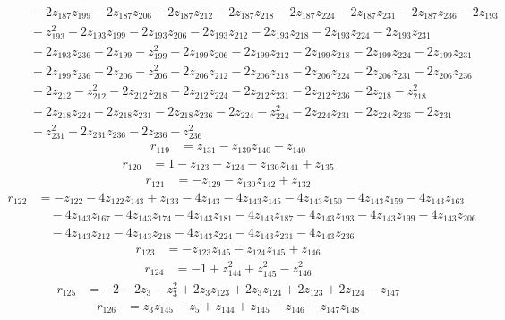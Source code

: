 \begin{align*}
&\quad -2z_{187}z_{199}-2z_{187}z_{206}-2z_{187}z_{212}-2z_{187}z_{218}-2z_{187}z_{224}-2z_{187}z_{231}-2z_{187}z_{236}-2z_{193}\\
&\quad -z_{193}^{2}-2z_{193}z_{199}-2z_{193}z_{206}-2z_{193}z_{212}-2z_{193}z_{218}-2z_{193}z_{224}-2z_{193}z_{231}\\
&\quad -2z_{193}z_{236}-2z_{199}-z_{199}^{2}-2z_{199}z_{206}-2z_{199}z_{212}-2z_{199}z_{218}-2z_{199}z_{224}-2z_{199}z_{231}\\
&\quad -2z_{199}z_{236}-2z_{206}-z_{206}^{2}-2z_{206}z_{212}-2z_{206}z_{218}-2z_{206}z_{224}-2z_{206}z_{231}-2z_{206}z_{236}\\
&\quad -2z_{212}-z_{212}^{2}-2z_{212}z_{218}-2z_{212}z_{224}-2z_{212}z_{231}-2z_{212}z_{236}-2z_{218}-z_{218}^{2}\\
&\quad -2z_{218}z_{224}-2z_{218}z_{231}-2z_{218}z_{236}-2z_{224}-z_{224}^{2}-2z_{224}z_{231}-2z_{224}z_{236}-2z_{231}\\
&\quad -z_{231}^{2}-2z_{231}z_{236}-2z_{236}-z_{236}^{2}
\end{align*}
\begin{align*}
r_{119} &=z_{131}-z_{139}z_{140}-z_{140}
\end{align*}
\begin{align*}
r_{120} &=1-z_{123}-z_{124}-z_{130}z_{141}+z_{135}
\end{align*}
\begin{align*}
r_{121} &=-z_{129}-z_{130}z_{142}+z_{132}
\end{align*}
\begin{align*}
r_{122} &=-z_{122}-4z_{122}z_{143}+z_{133}-4z_{143}-4z_{143}z_{145}-4z_{143}z_{150}-4z_{143}z_{159}-4z_{143}z_{163}\\
&\quad -4z_{143}z_{167}-4z_{143}z_{174}-4z_{143}z_{181}-4z_{143}z_{187}-4z_{143}z_{193}-4z_{143}z_{199}-4z_{143}z_{206}\\
&\quad -4z_{143}z_{212}-4z_{143}z_{218}-4z_{143}z_{224}-4z_{143}z_{231}-4z_{143}z_{236}
\end{align*}
\begin{align*}
r_{123} &=-z_{123}z_{145}-z_{124}z_{145}+z_{146}
\end{align*}
\begin{align*}
r_{124} &=-1+z_{144}^{2}+z_{145}^{2}-z_{146}^{2}
\end{align*}
\begin{align*}
r_{125} &=-2-2z_{3}-z_{3}^{2}+2z_{3}z_{123}+2z_{3}z_{124}+2z_{123}+2z_{124}-z_{147}
\end{align*}
\begin{align*}
r_{126} &=z_{3}z_{145}-z_{5}+z_{144}+z_{145}-z_{146}-z_{147}z_{148}
\end{align*}
